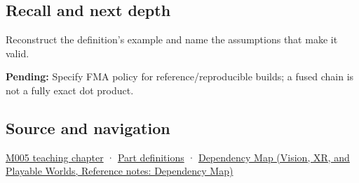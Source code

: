 \subsection{Recall and next depth}\label{appendix-41e8ef22a21e-recall-and-next-depth}

Reconstruct the definition's example and name the assumptions that make it valid.

\textbf{Pending:} Specify FMA policy for reference/reproducible builds; a fused chain is not a fully exact dot product.

\subsection{Source and navigation}\label{appendix-41e8ef22a21e-source-and-navigation}

\hyperref[01-foundations-i-ch001-when-arithmetic-meets-uncertainty]{M005 teaching chapter} · \hyperref[appendix-fd090d982a15-m005---parts-77-88]{Part definitions} · \href{../07-Vision-XR-and-Playable-Worlds/main.pdf\#nameddest=appendix-4ad47bdd269a}{Dependency Map (Vision, XR, and Playable Worlds, Reference notes: Dependency Map)}
